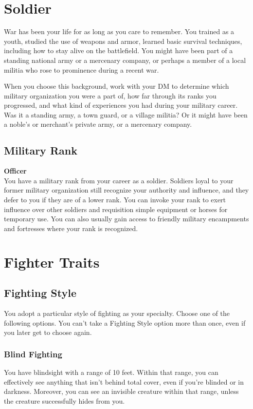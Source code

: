 {\section*{Soldier}
War has been your life for as long as you care to remember. You trained as a youth, studied the use of weapons and armor, learned basic survival techniques, including how to stay alive on the battlefield. You might have been part of a standing national army or a mercenary company, or perhaps a member of a local militia who rose to prominence during a recent war.

When you choose this background, work with your DM to determine which military organization you were a part of, how far through its ranks you progressed, and what kind of experiences you had during your military career. Was it a standing army, a town guard, or a village militia? Or it might have been a noble's or merchant's private army, or a mercenary company.
\subsection*{Military Rank}
\textbf{Officer}\\
You have a military rank from your career as a soldier. Soldiers loyal to your former military organization still recognize your authority and influence, and they defer to you if they are of a lower rank. You can invoke your rank to exert influence over other soldiers and requisition simple equipment or horses for temporary use. You can also usually gain access to friendly military encampments and fortresses where your rank is recognized.

\section*{Fighter Traits}
\subsection*{Fighting Style}
You adopt a particular style of fighting as your specialty. Choose one of the following options. You can't take a Fighting Style option more than once, even if you later get to choose again.
\subsubsection*{Blind Fighting}
You have blindsight with a range of 10 feet. Within that range, you can effectively see anything that isn't behind total cover, even if you're blinded or in darkness. Moreover, you can see an invisible creature within that range, unless the creature successfully hides from you.

}
